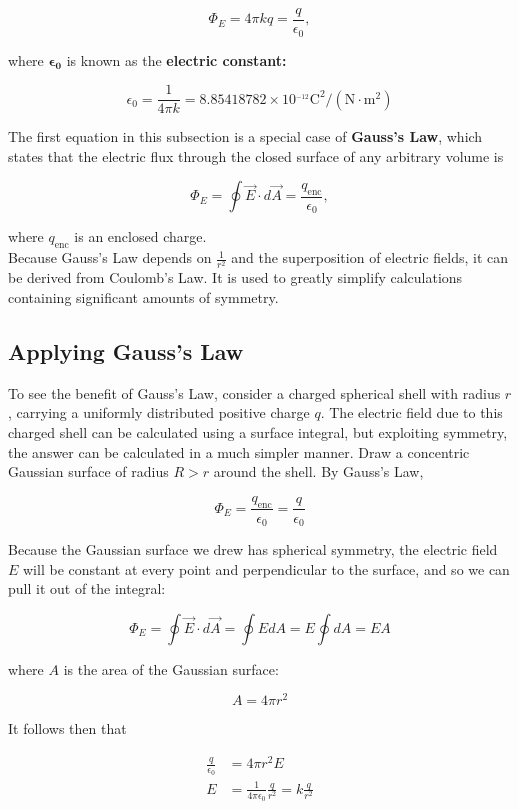         \[
            \Phi_E = 4\pi kq = \frac{q}{\epsilon_0},
        \]

        where $\mathbf{\epsilon_0}$ is known as the \textbf{electric constant:}

        \[
            \epsilon_0 = \frac{1}{4\pi k} = 8.85418782 \times 10^_{-12} \text{C}^2/(\text{N}\cdot\text{m}^2)
        \]

        The first equation in this subsection is a special case of \textbf{Gauss's Law}, which states that the electric flux through the closed surface of any arbitrary volume is

        \[
            \Phi_E = \oint \vec{E}\cdot d\vec{A} = \frac{q_{\text{enc}}}{\epsilon_0},
        \]

        where $q_{\text{enc}}$ is an enclosed charge. \\

        Because Gauss's Law depends on $\frac{1}{r^2}$ and the superposition of electric fields, it can be derived from Coulomb's Law. It is used to greatly simplify calculations containing significant amounts of
        symmetry.

    \subsection{Applying Gauss's Law}   %

        To see the benefit of Gauss's Law, consider a charged spherical shell with radius $r$, carrying a uniformly distributed positive charge $q$. The electric field due to this charged shell can be calculated using
        a surface integral, but exploiting symmetry, the answer can be calculated in a much simpler manner. Draw a concentric Gaussian surface of radius $R > r$ around the shell. By Gauss's Law,

        \[
            \Phi_E = \frac{q_{\text{enc}}}{\epsilon_0} = \frac{q}{\epsilon_0}
        \]

        Because the Gaussian surface we drew has spherical symmetry, the electric field $E$ will be constant at every point and perpendicular to the surface, and so we can pull it out of the integral:

        \[
            \Phi_E = \oint \vec{E}\cdot d\vec{A} = \oint EdA = E\oint dA = EA
        \]

        where $A$ is the area of the Gaussian surface:

        \[
            A = 4\pi r^2
        \]

        It follows then that

        \begin{align*}
            \frac{q}{\epsilon_0} &= 4\pi r^2 E \\
            E                    &= \frac{1}{4\pi \epsilon_0} \frac{q}{r^2} = k \frac{q}{r^2}
        \end{align*}